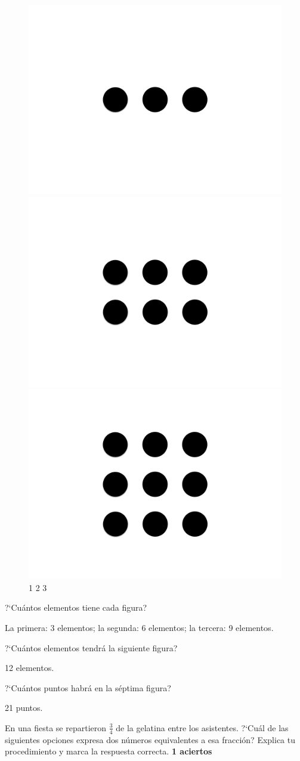 \documentclass[11pt]{article}
\begin{document}
\begin{figure}[h]
    \centering
    \includegraphics[width=0.17\linewidth]{figures004.png}
    \includegraphics[width=0.17\linewidth]{figures005.png}
    \includegraphics[width=0.17\linewidth]{figures006.png}\\
    1 \hspace{2.5cm} 2 \hspace{2.5cm} 3
\end{figure}

?`Cu\'antos elementos tiene cada figura?

La primera: 3 elementos; \hspace{1cm} la segunda: 6 elementos; \hspace{1cm} la tercera: 9 elementos.

\vspace{5mm}

?`Cu\'antos elementos tendr\'a la siguiente figura?

12 elementos.

\vspace{5mm}

?`Cu\'antos puntos habr\'a en la s\'eptima figura?

21 puntos.

\vspace{1cm}

En una fiesta se repartieron $\frac{3}{4}$ de la gelatina entre los asistentes.
?`Cu\'al de las siguientes opciones expresa dos n\'umeros equivalentes a esa
fracci\'on? Explica tu procedimiento y marca la respuesta correcta.  \hfill \textbf{1 aciertos}
\end{document}
